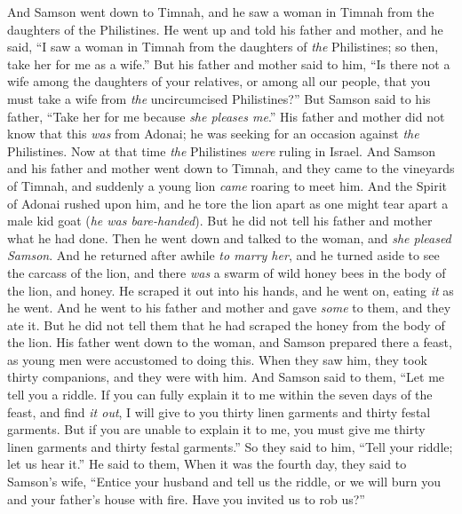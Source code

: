 \begin{biblechapter} %
 And Samson went down to Timnah, and he saw a woman in Timnah from the daughters of the Philistines.
\verse He went up and told his father and mother, and he said, “I saw a woman in Timnah from the daughters of \textit{the} Philistines; so then, take her for me as a wife.”
\verse But his father and mother said to him, “Is there not a wife among the daughters of your relatives, or among all our people, that you must take a wife from \textit{the} uncircumcised Philistines?” But Samson said to his father, “Take her for me because \textit{she pleases me}.”
\verse His father and mother did not know that this \textit{was} from Adonai; he was seeking for an occasion against \textit{the} Philistines. Now at that time \textit{the} Philistines \textit{were} ruling in Israel.
\verse And Samson and his father and mother went down to Timnah, and they came to the vineyards of Timnah, and suddenly a young lion \textit{came} roaring to meet him.
\verse And the Spirit of Adonai rushed upon him, and he tore the lion apart as one might tear apart a male kid goat (\textit{he was bare-handed}). But he did not tell his father and mother what he had done.
\verse Then he went down and talked to the woman, and \textit{she pleased Samson}.
\verse And he returned after awhile \textit{to marry her}, and he turned aside to see the carcass of the lion, and there \textit{was} a swarm of wild honey bees in the body of the lion, and honey.
\verse He scraped it out into his hands, and he went on, eating \textit{it} as he went. And he went to his father and mother and gave \textit{some} to them, and they ate it. But he did not tell them that he had scraped the honey from the body of the lion.
\verse His father went down to the woman, and Samson prepared there a feast, as young men were accustomed to doing this.
\verse When they saw him, they took thirty companions, and they were with him.
\verse And Samson said to them, “Let me tell you a riddle. If you can fully explain it to me within the seven days of the feast, and find \textit{it out}, I will give to you thirty linen garments and thirty festal garments.
\verse But if you are unable to explain it to me, you must give me thirty linen garments and thirty festal garments.” So they said to him, “Tell your riddle; let us hear it.”
\verse He said to them,
\verse When it was the fourth day, they said to Samson’s wife, “Entice your husband and tell us the riddle, or we will burn you and your father’s house with fire. Have you invited us to rob us?”

\end{biblechapter}
